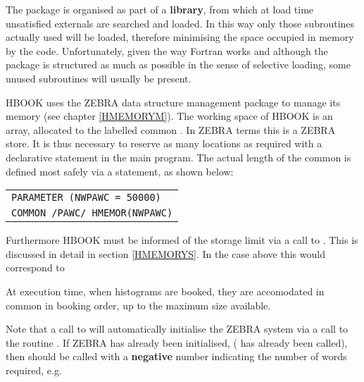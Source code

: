 The package is organised as part of a {\bf library}, from which
at load time unsatisfied externals are searched and loaded.
In this way only those subroutines actually used will be
loaded, therefore minimising the space occupied in memory by the code.
Unfortunately, given the way Fortran
works and although the package is structured as much as possible in the
sense of selective loading, some unused subroutines will usually be
present.

\newpage

HBOOK uses the ZEBRA \cite{bib-ZEBRA} data structure
management package to manage its memory (see chapter \ref{HMEMORYM}).
The working space of HBOOK is an array, allocated to the labelled
common .
In ZEBRA terms this is a ZEBRA store.
It is thus necessary to reserve as many locations as required with a
declarative statement in the main program.
The actual length of the common is defined most safely via 
a  statement, as shown below:

\begin{center}
\begin{tabular}{|>{\tt}l|}
\hline
PARAMETER (NWPAWC = 50000)\\
COMMON /PAWC/ HMEMOR(NWPAWC)\\
\hline
\end{tabular}
\end{center}

Furthermore HBOOK must be informed of the storage 
limit via a call to .
This is discussed in detail in section \vref{HMEMORYS}.
In the case above this would correspond to

\begin{center}
\end{center}
\Rind[HLIMIT]{}
 
At execution time, when histograms are booked, they are accomodated
in common  in booking order, up to the maximum size available.

Note that a call to  will automatically initialise the ZEBRA system
via a call to the routine .
If ZEBRA has already been initialised, ( has already been called),
then  should be called with a
{\bf negative} number indicating the number of words required, e.g.

\begin{center}
\end{center}
\Rind[HLIMIT]{}

